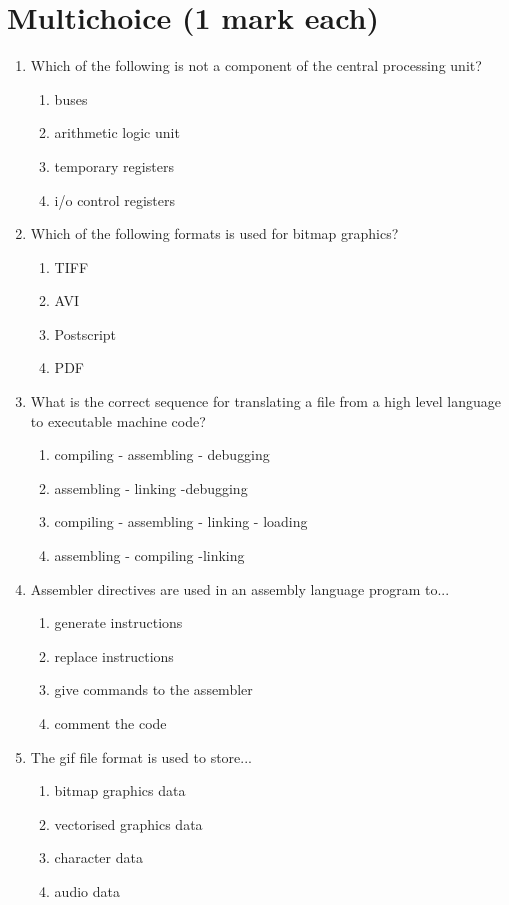 \documentclass[a4paper,10pt]{article}
\begin{document}
\section{Multichoice (1 mark each)}
\begin{enumerate}

\item Which of the following is not a component of the central
processing unit?
\begin{enumerate}
 \item buses
 \item arithmetic logic unit
 \item temporary registers
 \item i/o control registers
\end{enumerate}

\item Which of the following formats is used for bitmap graphics? 
\begin{enumerate}
  \item TIFF
  \item AVI
  \item Postscript
  \item PDF
\end{enumerate}

\item What is the correct sequence for translating a file from a high level language to executable
machine code? 
\begin{enumerate}
  \item compiling - assembling - debugging
  \item assembling - linking -debugging
  \item compiling - assembling - linking - loading 
  \item assembling - compiling -linking
\end{enumerate}

\item Assembler directives are used in an assembly language program to...
\begin{enumerate}
  \item generate instructions
  \item replace instructions
  \item give commands to the assembler
  \item comment the code
\end{enumerate}

\newpage
\item The gif file format is used to store...
\begin{enumerate}
  \item bitmap graphics data
  \item vectorised graphics data
  \item character data
  \item audio data
\end{enumerate}


\end{enumerate}
\end{document}
